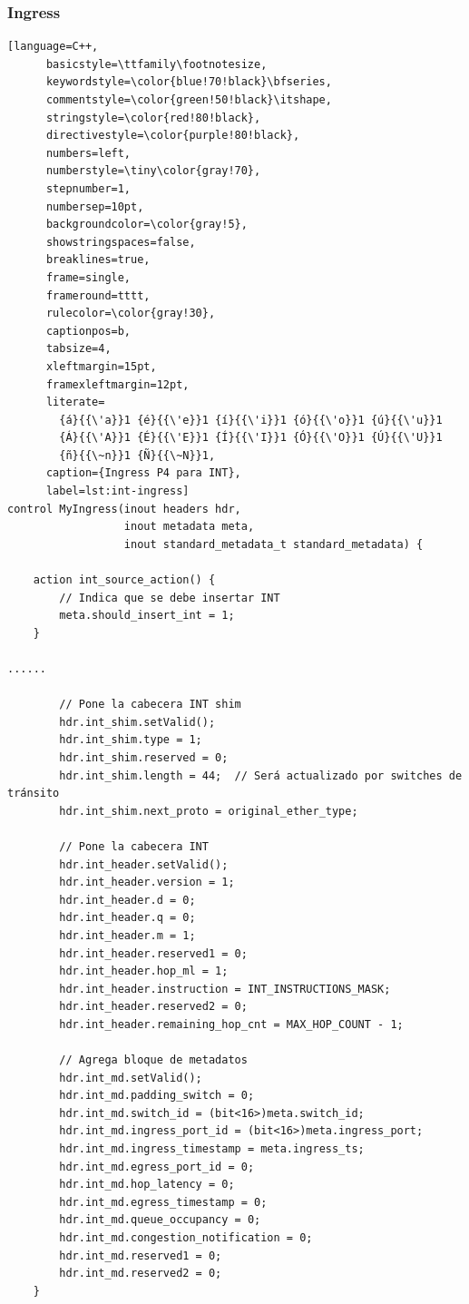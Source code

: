 \subsubsection{Ingress}
  \begin{lstlisting}[language=C++,
      basicstyle=\ttfamily\footnotesize,
      keywordstyle=\color{blue!70!black}\bfseries,
      commentstyle=\color{green!50!black}\itshape,
      stringstyle=\color{red!80!black},
      directivestyle=\color{purple!80!black},
      numbers=left,
      numberstyle=\tiny\color{gray!70},
      stepnumber=1,
      numbersep=10pt,
      backgroundcolor=\color{gray!5},
      showstringspaces=false,
      breaklines=true,
      frame=single,
      frameround=tttt,
      rulecolor=\color{gray!30},
      captionpos=b,
      tabsize=4,
      xleftmargin=15pt,
      framexleftmargin=12pt,
      literate=
        {á}{{\'a}}1 {é}{{\'e}}1 {í}{{\'i}}1 {ó}{{\'o}}1 {ú}{{\'u}}1
        {Á}{{\'A}}1 {É}{{\'E}}1 {Í}{{\'I}}1 {Ó}{{\'O}}1 {Ú}{{\'U}}1
        {ñ}{{\~n}}1 {Ñ}{{\~N}}1,
      caption={Ingress P4 para INT}, 
      label=lst:int-ingress]
control MyIngress(inout headers hdr,
                  inout metadata meta,
                  inout standard_metadata_t standard_metadata) {

    action int_source_action() {
        // Indica que se debe insertar INT
        meta.should_insert_int = 1;
    }

......

        // Pone la cabecera INT shim
        hdr.int_shim.setValid();
        hdr.int_shim.type = 1;
        hdr.int_shim.reserved = 0;
        hdr.int_shim.length = 44;  // Será actualizado por switches de tránsito
        hdr.int_shim.next_proto = original_ether_type;

        // Pone la cabecera INT
        hdr.int_header.setValid();
        hdr.int_header.version = 1;
        hdr.int_header.d = 0;
        hdr.int_header.q = 0;
        hdr.int_header.m = 1;
        hdr.int_header.reserved1 = 0;
        hdr.int_header.hop_ml = 1;
        hdr.int_header.instruction = INT_INSTRUCTIONS_MASK;
        hdr.int_header.reserved2 = 0;
        hdr.int_header.remaining_hop_cnt = MAX_HOP_COUNT - 1;

        // Agrega bloque de metadatos
        hdr.int_md.setValid();
        hdr.int_md.padding_switch = 0;
        hdr.int_md.switch_id = (bit<16>)meta.switch_id;
        hdr.int_md.ingress_port_id = (bit<16>)meta.ingress_port;
        hdr.int_md.ingress_timestamp = meta.ingress_ts;
        hdr.int_md.egress_port_id = 0;
        hdr.int_md.hop_latency = 0;
        hdr.int_md.egress_timestamp = 0;
        hdr.int_md.queue_occupancy = 0;
        hdr.int_md.congestion_notification = 0;
        hdr.int_md.reserved1 = 0;
        hdr.int_md.reserved2 = 0;
    }


\end{lstlisting}
